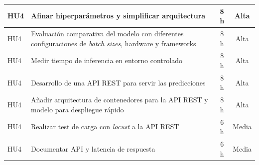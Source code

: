\documentclass[
11pt, %
]{charter}
\begin{document}
\begin{table}[htpb]
\begin{tabularx}{\linewidth}{@{}|X|X|c|c|@{}}
HU4 & Afinar hiperparámetros y simplificar arquitectura					 & 8 h & Alta \\ \hline
HU4 & Evaluación comparativa del modelo con diferentes configuraciones de \textit{batch sizes}, hardware y frameworks				 & 8 h & Alta \\ \hline
HU4 & Medir tiempo de inferencia en entorno controlado					 & 8 h & Alta \\ \hline
HU4 & Desarrollo de una API REST para servir las predicciones 					 & 8 h & Alta \\ \hline
HU4 & Añadir arquitectura de contenedores para la API REST y modelo para despliegue rápido	 					 & 8 h & Alta \\ \hline
HU4 & Realizar test de carga con \textit{locust} a la API REST  					 & 6 h & Media \\ \hline
HU4 & Documentar API y latencia de respuesta	  					 & 6 h & Media \\ \hline



\end{tabularx}
\end{table}
\end{document}
